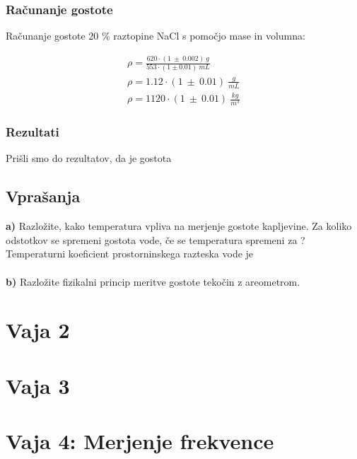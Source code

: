 \documentclass{report}
\begin{document}
\pagebreak

\subsection{Računanje gostote}

Računanje gostote 20 \% raztopine NaCl s pomočjo mase in volumna:

\begin{equation}
  \label{eq:1}
  \begin{gathered}
    \rho = \frac{620 \cdot (1 \ \pm \ 0.002)\ g}{553 \cdot (1 \pm 0.01) \ mL} \\
    \rho = 1.12 \cdot (1 \ \pm \ 0.01) \ \frac{g}{mL} \\
    \rho = 1120 \cdot (1 \ \pm \ 0.01) \ \frac{kg}{m^3}
  \end{gathered}
\end{equation}

\subsection{Rezultati}

Prišli smo do rezultatov, da je gostota 


\pagebreak
\section{Vprašanja}
\textbf{a)} Razložite, kako temperatura vpliva na merjenje gostote 
kapljevine. Za koliko odstotkov se spremeni gostota vode, če se 
temperatura spremeni za ? Temperaturni koeficient prostorninskega 
razteska vode je 
\\\\
\textbf{b)} Razložite fizikalni princip meritve gostote tekočin z areometrom.

\chapter{Vaja 2}


\chapter{Vaja 3}


\chapter{Vaja 4: Merjenje frekvence}
\end{document}
